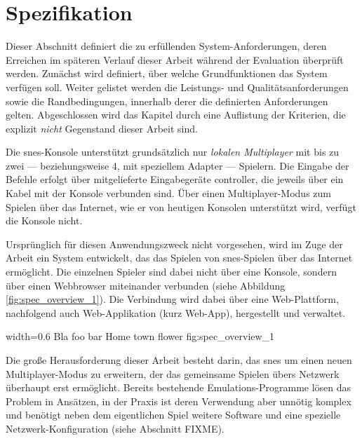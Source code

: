 \chapter{Spezifikation}\label{spezifikation}

Dieser Abschnitt definiert die zu erfüllenden System-Anforderungen,
deren Erreichen im späteren Verlauf dieser Arbeit während der Evaluation
überprüft werden. Zunächst wird definiert, über welche Grundfunktionen
das System verfügen soll. Weiter gelistet werden die Leistungs- und
Qualitätsanforderungen sowie die Randbedingungen, innerhalb derer die
definierten Anforderungen gelten. Abgeschlossen wird das Kapitel durch
eine Auflistung der Kriterien, die explizit \emph{nicht} Gegenstand
dieser Arbeit sind.

\newpage


Die \gls{snes}-Konsole unterstützt grundsätzlich nur \emph{lokalen
Multiplayer} mit bis zu zwei --- beziehungsweise 4, mit speziellem
Adapter --- Spielern. Die Eingabe der Befehle erfolgt über mitgelieferte
Eingabegeräte \gls{controller}, die jeweils über ein Kabel mit der
Konsole verbunden sind. Über einen Multiplayer-Modus zum Spielen über
das Internet, wie er von heutigen Konsolen unterstützt wird, verfügt die
Konsole nicht.

Ursprünglich für diesen Anwendungszweck nicht vorgesehen, wird im Zuge
der Arbeit ein System entwickelt, das das Spielen von \gls{snes}-Spielen
über das Internet ermöglicht. Die einzelnen Spieler sind dabei nicht
über eine Konsole, sondern über einen Webbrowser miteinander verbunden
(siehe Abbildung \ref{fig:spec_overview_1}). Die Verbindung wird dabei
über eine Web-Plattform, nachfolgend auch Web-Applikation (kurz
Web-App), hergestellt und verwaltet.

   {width=0.6\textwidth}
   {Bla foo bar}
   {Home town flower}
   {fig:spec_overview_1}

Die große Herausforderung dieser Arbeit besteht darin, das \gls{snes} um
einen neuen Multiplayer-Modus zu erweitern, der das gemeinsame Spielen
übers Netzwerk überhaupt erst ermöglicht. Bereits bestehende
Emulations-Programme lösen das Problem in Ansätzen, in der Praxis ist
deren Verwendung aber unnötig komplex und benötigt neben dem
eigentlichen Spiel weitere Software und eine spezielle
Netzwerk-Konfiguration (siehe Abschnitt FIXME).

